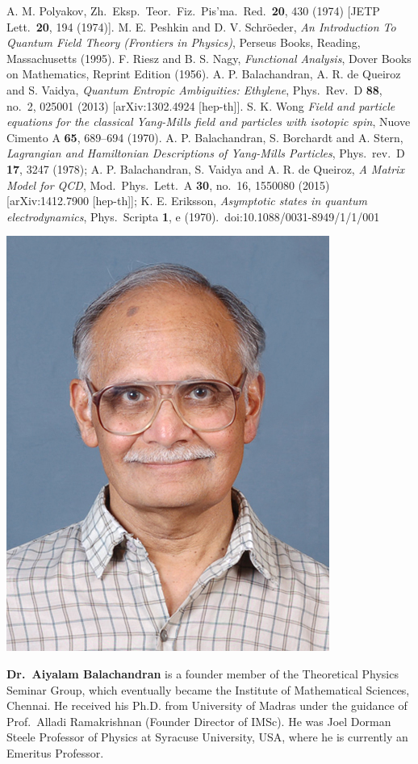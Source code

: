 \begin{thebibliography}{99}
A. M. Polyakov, Zh.\ Eksp.\ Teor.\ Fiz.\ Pis'ma.\ Red.\ \textbf{20}, 430 (1974) [JETP Lett.\ \textbf{20}, 194 (1974)].
 M. E. Peshkin and D. V. Schr\"oeder, \textit{An Introduction To Quantum Field Theory (Frontiers in Physics)}, Perseus Books, Reading, Massachusetts (1995).
 F. Riesz and B. S. Nagy, \textit{Functional Analysis}, Dover Books on Mathematics, Reprint Edition (1956).
 A. P. Balachandran, A. R. de Queiroz and S. Vaidya, \textit{Quantum Entropic Ambiguities: Ethylene}, Phys.\ Rev.\ D \textbf{88}, no.\ 2, 025001 (2013) [arXiv:1302.4924 [hep-th]].
 S. K. Wong \textit{Field and particle equations for the classical Yang-Mills field and particles with isotopic spin}, Nuove Cimento A \textbf{65}, 689--694 (1970).
 A. P. Balachandran, S. Borchardt and A. Stern, \textit{Lagrangian and Hamiltonian Descriptions of Yang-Mills Particles}, Phys.\ rev.\ D \textbf{17}, 3247 (1978);
 A. P. Balachandran, S. Vaidya and A. R. de Queiroz, \textit{A Matrix Model for QCD}, Mod.\ Phys.\ Lett.\ A \textbf{30}, no.\ 16, 1550080 (2015) [arXiv:1412.7900 [hep-th]];
 K. E. Eriksson, \textit{Asymptotic states in quantum electrodynamics}, Phys.\ Scripta \textbf{1}, e (1970).\ doi:10.1088/0031-8949/1/1/001
\end{thebibliography}
\newpage


\centerline{\includegraphics[scale=1]{authorsphotos/A._P._Balachandran.jpg}}
\smallskip

\bigskip

\noindent
\textbf{Dr.\ Aiyalam Balachandran} is a founder member of the Theoretical Physics Seminar Group, which eventually became the Institute of Mathematical Sciences, Chennai.  He received his Ph.D. from University of Madras under the guidance of Prof.\ Alladi Ramakrishnan (Founder Director of IMSc). He was Joel Dorman Steele Professor of Physics at Syracuse University, USA, where he is currently an Emeritus Professor.
